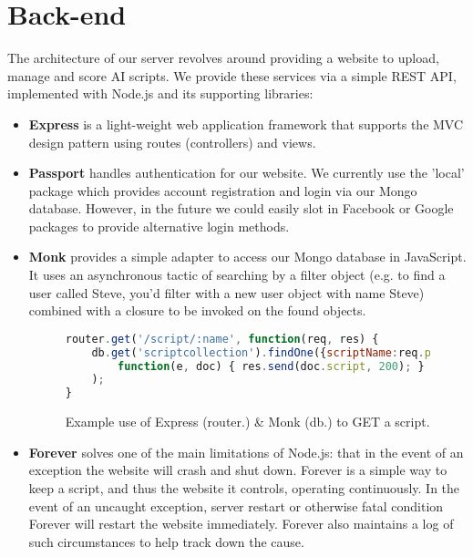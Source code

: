 \begin{center}
\end{center}

\section{Back-end}
The architecture of our server revolves around providing a website to upload, manage and score AI scripts. We provide these services via a simple REST API, implemented with Node.js\cite{whynode} and its supporting libraries:
	\begin{itemize}
	        \item \textbf{Express}\cite{express} is a light-weight web application framework that supports the MVC design pattern using routes (controllers) and views.  
		\item \textbf{Passport}\cite{passport} handles authentication for our website. We currently use the 'local' package which provides account registration and login via our Mongo database. However, in the future we could easily slot in Facebook or Google packages to provide alternative login methods.	
		\item \textbf{Monk}\cite{monk} provides a simple adapter to access our Mongo database in JavaScript. It uses an asynchronous tactic of searching by a filter object (e.g. to find a user called Steve, you'd filter with a new user object with name Steve) combined with a closure to be invoked on the found objects. 
\begin{figure}[H]
\centering
\begin{lstlisting}[language=JavaScript]
router.get('/script/:name', function(req, res) {
    db.get('scriptcollection').findOne({scriptName:req.params.name},  
        function(e, doc) { res.send(doc.script, 200); }
    );
}
\end{lstlisting}
\caption{Example use of Express (router.) \& Monk (db.) to GET a script.}
\label{fig:getscript}
\end{figure}
		
		\item \textbf{Forever} solves one of the main limitations of Node.js: that in the event of an exception the website will crash and shut down. Forever is a simple way to keep a script, and thus the website it controls, operating continuously. In the event of an uncaught exception, server restart or otherwise fatal condition Forever will restart the website immediately. Forever also maintains a log of such circumstances to help track down the cause.
	\end{itemize}

